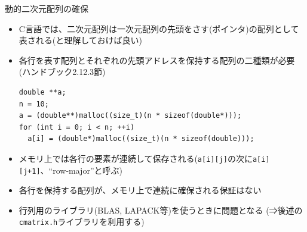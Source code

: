 \begin{frame}[t,fragile]{動的二次元配列の確保}
  \begin{itemize}
    \item C言語では、二次元配列は一次元配列の先頭をさす(ポインタ)の配列として表される(と理解しておけば良い)
    \item 各行を表す配列とそれぞれの先頭アドレスを保持する配列の二種類が必要 (ハンドブック2.12.3節)
    \begin{lstlisting}
double **a;
n = 10;  
a = (double**)malloc((size_t)(n * sizeof(double*)));
for (int i = 0; i < n; ++i)
  a[i] = (double*)malloc((size_t)(n * sizeof(double)));
    \end{lstlisting}
  \item メモリ上では各行の要素が連続して保存される(\verb+a[i][j]+の次に\verb!a[i][j+1]!、``row-major''と呼ぶ)
  \item 各行を保持する配列が、メモリ上で連続に確保される保証はない
  \item 行列用のライブラリ(BLAS, LAPACK等)を使うときに問題となる (⇒後述の\verb+cmatrix.h+ライブラリを利用する)
  \end{itemize}
\end{frame}
